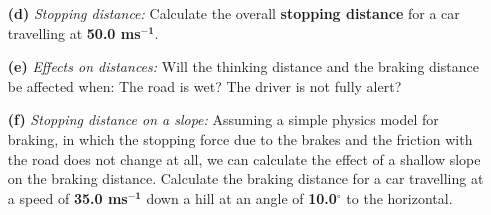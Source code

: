 \documentclass[A4,12pt]{article}
\begin{document}
\begin{enumerate}[label=\bfseries (\arabic*)]
\begin{itemize}
    \item[\bf (d)] {\it Stopping distance:} Calculate the overall {\bf stopping distance} for a car travelling at {\bf 50.0 ms}$\bm{^{-1}}$.
    \item[\bf (e)] {\it Effects on distances:} Will the thinking distance and the braking distance be affected when: The road is wet? The driver is not fully alert?
    \item[\bf (f)] {\it Stopping distance on a slope:} Assuming a simple physics model for braking, in which the stopping force due to the brakes and the friction with the road does not change at all, we can calculate the effect of a shallow slope on the braking distance. Calculate the braking distance for a car travelling at a speed of {\bf 35.0 ms}$\bm{^{-1}}$ down a hill at an angle of {\bf 10.0}$\bm{^\circ}$ to the horizontal.
\end{itemize}
%
%
%
%
%
%
%
%
%
%
%
%
%
%
%
%
%
%
%
%

\end{enumerate}
\end{document}
